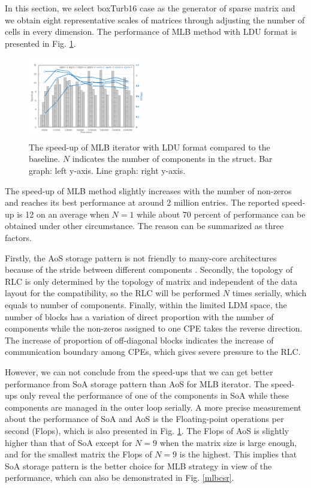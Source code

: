 \documentclass[5p,times]{elsarticle}
\begin{document}
In this section, we select boxTurb16 case as the generator of sparse matrix and we obtain eight representative scales of matrices through adjusting the number of cells in every dimension.
The performance of MLB method with LDU format is presented in Fig. \ref{mlbldu}. 
\begin{figure}[tbp]
\centerline{\includegraphics[width=0.45\textwidth]{mlb(ldu)-1.png}}
\caption{The speed-up of MLB iterator with LDU format compared to the baseline. $N$ indicates the number of components in the struct. Bar graph: left y-axis. Line graph: right y-axis.}
\label{mlbldu}
\end{figure}
The speed-up of MLB method slightly increases with the number of non-zeros and reaches its best performance at around 2 million entries. The reported speed-up is 12 on an average when $N=1$ while about 70 percent of performance can be obtained under other circumstance. The reason can be summarized as three factors.

Firstly, the AoS storage pattern is not friendly to many-core architectures because of the stride between different components \cite{b10}\cite{b11}. Secondly, the topology of RLC is only determined by the topology of matrix and independent of the data layout for the compatibility, so the RLC will be performed $N$ times serially, which equals to number of components. Finally, within the limited LDM space, the number of blocks has a variation of direct proportion with the number of components while the non-zeros assigned to one CPE takes the reverse direction. The increase of proportion of off-diagonal blocks indicates the increase of communication boundary among CPEs, which gives severe pressure to the RLC.

However, we can not conclude from the speed-ups that we can get better performance from SoA storage pattern than AoS for MLB iterator. The speed-ups only reveal the performance of one of the components in SoA while these components are managed in the outer loop serially. A more precise measurement about the performance of SoA and AoS is the Floating-point operations per second (Flops), which is also presented in Fig. \ref{mlbldu}. The Flops of AoS is slightly higher than that of SoA except for $N=9$ when the matrix size is large enough, and for the smallest matrix the Flops of $N=9$ is the highest. This implies that SoA storage pattern is the better choice for MLB strategy in view of the performance, which can also be demonstrated in Fig. \ref{mlbcsr}.
\end{document}
